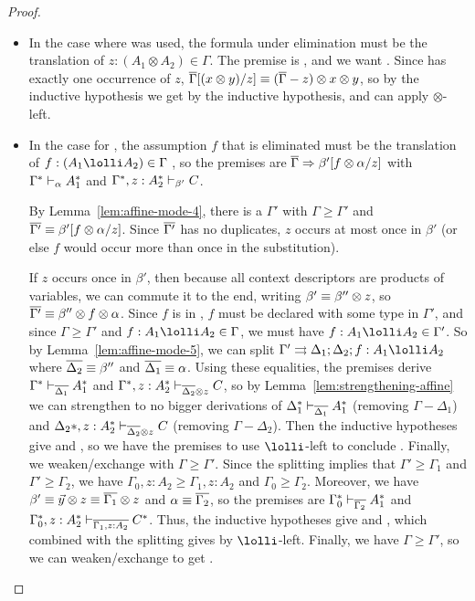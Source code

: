 \begin{proof}
\begin{itemize}
\item 
  In the case where \FL\/ was used, the formula under elimination must
  be the translation of $z:(A_1 \otimes A_2) \in \Gamma$. The premise is
  ,
  and we want .  Since \vars{\Gamma} has exactly one
  occurrence of $z$, $\overline{\Gamma}[(x \otimes y)/z] \equiv
  (\overline{\Gamma}-z)\otimes x \otimes y$, so by the inductive hypothesis
  we get  by the inductive hypothesis, and
  can apply $\otimes$-left.

\item In the case for \UL, the assumption $f$ that is eliminated must be
  the translation of $f:(A_1 \lolli A_2) \in \Gamma$ , so the premises
  are $\overline{\Gamma} \Rightarrow \beta'[f \otimes \alpha/z]$ with
  $\Gamma^* \vdash_{\alpha} A_1^*$ and
  $\Gamma^*,z:A_2^* \vdash_{\beta'} C$. 

  By Lemma~\ref{lem:affine-mode-4}, there is a $\Gamma'$ with $\Gamma
  \ge \Gamma'$ and $\overline{\Gamma'} \equiv \beta'[f \otimes \alpha/z]$.
  Since $\overline{\Gamma'}$ has no duplicates, $z$ occurs at most once in
  $\beta'$ (or else $f$ would occur more than once in the substitution).
  
  If $z$ occurs once in $\beta'$, then because all context descriptors
  are products of variables, we can commute it to the end, writing
  $\beta' \equiv \beta'' \otimes z$, so $\overline{\Gamma'} \equiv \beta''
  \otimes f \otimes \alpha$.  Since $f$ is in , $f$ must
  be declared with some type in $\Gamma'$, and since $\Gamma \ge
  \Gamma'$ and $f:A_1 \lolli A_2 \in \Gamma$, we must have $f:A_1 \lolli
  A_2 \in \Gamma'$.  So by Lemma~\ref{lem:affine-mode-5}, we can split
  $\Gamma' \splits \Delta_1;\Delta_2;f:A_1 \lolli A_2$ where
  $\overline{\Delta_2} \equiv \beta''$ and $\overline{\Delta_1} \equiv \alpha$.
  Using these equalities, the premises derive
  $\Gamma^* \vdash_{\overline{\Delta_1}} A_1^*$ and
  $\Gamma^*,z:A_2^* \vdash_{\overline{\Delta_2} \otimes z} C$, so by
  Lemma~\ref{lem:strengthening-affine} we can strengthen to no bigger
  derivations of
  $\Delta_1^* \vdash_{\overline{\Delta_1}} A_1^*$ (removing $\Gamma-\Delta_1$) and
  $\Delta_2*,z:A_2^* \vdash_{\overline{\Delta_2} \otimes z} C$ (removing $\Gamma-\Delta_2$).
  Then the inductive hypotheses give  and
  , so we have the premises to use $\lolli$-left
  to conclude .  Finally, we weaken/exchange with
  $\Gamma \ge \Gamma'$.
  Since the splitting implies that $\Gamma' \ge \Gamma_1$ and $\Gamma'
  \ge \Gamma_2$, we have $\Gamma_0,z:A_2 \ge \Gamma_1,z:A_2$ and
  $\Gamma_0 \ge \Gamma_2$.  Moreover, we have $\beta' \equiv \vec{y}
  \otimes z \equiv \overline{\Gamma_1} \otimes z$ and $\alpha \equiv
  \overline{\Gamma_2}$, so the premises are
  $\Gamma_0^* \vdash_{\overline{\Gamma_2}} A_1^*$ and
  $\Gamma_0^*,z:A_2^* \vdash_{\overline{\Gamma_1,z:A_2}} C^*$.  Thus, the
  inductive hypotheses give  and
  , which combined with the splitting gives
   by $\lolli$-left.  Finally, we have $\Gamma \ge
  \Gamma'$, so we can weaken/exchange to get .


\end{itemize}
\end{proof}
